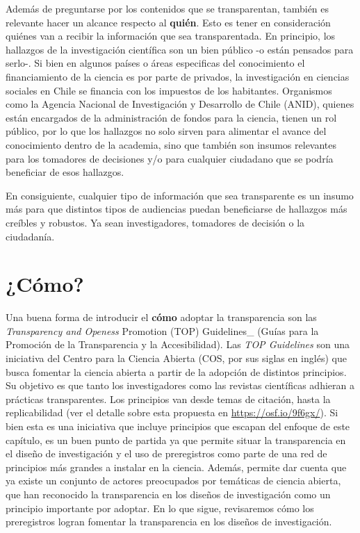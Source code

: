 \documentclass[
  spanish,
  a4paper,
  oneside]{scrbook}
\begin{document}
Además de preguntarse por los contenidos que se transparentan, también
es relevante hacer un alcance respecto al \textbf{quién}. Esto es tener
en consideración quiénes van a recibir la información que sea
transparentada. En principio, los hallazgos de la investigación
científica son un bien público -o están pensados para serlo-. Si bien en
algunos países o áreas especificas del conocimiento el financiamiento de
la ciencia es por parte de privados, la investigación en ciencias
sociales en Chile se financia con los impuestos de los habitantes.
Organismos como la Agencia Nacional de Investigación y Desarrollo de
Chile (ANID), quienes están encargados de la administración de fondos
para la ciencia, tienen un rol público, por lo que los hallazgos no solo
sirven para alimentar el avance del conocimiento dentro de la academia,
sino que también son insumos relevantes para los tomadores de decisiones
y/o para cualquier ciudadano que se podría beneficiar de esos hallazgos.

En consiguiente, cualquier tipo de información que sea transparente es
un insumo más para que distintos tipos de audiencias puedan beneficiarse
de hallazgos más creíbles y robustos. Ya sean investigadores, tomadores
de decisión o la ciudadanía.

\section{¿Cómo?}\label{cuxf3mo}

Una buena forma de introducir el \textbf{cómo} adoptar la transparencia
son las \emph{Transparency and Openess} Promotion (TOP) Guidelines\_
(Guías para la Promoción de la Transparencia y la Accesibilidad). Las
\emph{TOP Guidelines} son una iniciativa del Centro para la Ciencia
Abierta (COS, por sus siglas en inglés) que busca fomentar la ciencia
abierta a partir de la adopción de distintos principios. Su objetivo es
que tanto los investigadores como las revistas científicas adhieran a
prácticas transparentes. Los principios van desde temas de citación,
hasta la replicabilidad (ver el detalle sobre esta propuesta en
\url{https://osf.io/9f6gx/}). Si bien esta es una iniciativa que incluye
principios que escapan del enfoque de este capítulo, es un buen punto de
partida ya que permite situar la transparencia en el diseño de
investigación y el uso de preregistros como parte de una red de
principios más grandes a instalar en la ciencia. Además, permite dar
cuenta que ya existe un conjunto de actores preocupados por temáticas de
ciencia abierta, que han reconocido la transparencia en los diseños de
investigación como un principio importante por adoptar. En lo que sigue,
revisaremos cómo los preregistros logran fomentar la transparencia en
los diseños de investigación.
\end{document}

